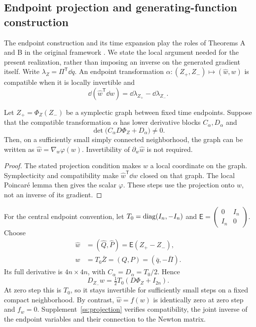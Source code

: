 \subsection{Endpoint projection and generating-function construction}
\label{struct:endpoint-section}

The endpoint construction and its time expansion play the roles of Theorems A and B in the original framework \citep{feng,fengqin}. We state the local argument needed for the present realization, rather than imposing an inverse on the generated gradient itself. Write $\lambda_Z=\Pi^{\mathsf T}\dd q$. An endpoint transformation $\alpha:(Z_+,Z_-)\mapsto(\widehat w,w)$ is compatible when it is locally invertible and
\[
 \dd(\widehat w^{\mathsf T}\dd w)
      =\dd\lambda_{Z_+}-\dd\lambda_{Z_-}.
\]

\begin{proposition}
\label{struct:endpoint-proposition}
Let $Z_+=\Phi_Z(Z_-)$ be a symplectic graph between fixed time endpoints. Suppose that the compatible transformation $\alpha$ has lower derivative blocks $C_\alpha,D_\alpha$ and
\[
 \det\bigl(C_\alpha D\Phi_Z+D_\alpha\bigr)\ne0.
\]
Then, on a sufficiently small simply connected neighborhood, the graph can be written as $\widehat w=\nabla_w\varphi(w)$. Invertibility of $\partial_w\widehat w$ is not required.
\end{proposition}

\begin{proof}
The stated projection condition makes $w$ a local coordinate on the graph. Symplecticity and compatibility make $\widehat w^{\mathsf T}\dd w$ closed on that graph. The local Poincar\'e lemma then gives the scalar $\varphi$. These steps use the projection onto $w$, not an inverse of its gradient.
\end{proof}

For the central endpoint convention, let $T_0=\operatorname{diag}(I_n,-I_n)$ and $\mathsf E=\left(\begin{smallmatrix}0&I_n\\I_n&0\end{smallmatrix}\right)$. Choose
\begin{equation}\label{struct:endpoint-variables}
\begin{aligned}
 \widehat w&=(\widehat Q,\widehat P)=\mathsf E(Z_+-Z_-),\\
 w&=T_0\bar Z=(Q,P)=(\bar q,-\bar\Pi).
\end{aligned}
\end{equation}
Its full derivative is $4n\times4n$, with $C_\alpha=D_\alpha=T_0/2$. Hence
\begin{equation}\label{struct:endpoint-projection}
 D_{Z_-}w=\tfrac12T_0(D\Phi_Z+I_{2n}).
\end{equation}
At zero step this is $T_0$, so it stays invertible for sufficiently small steps on a fixed compact neighborhood. By contrast, $\widehat w=f(w)$ is identically zero at zero step and $f_w=0$. Supplement~\ref{ss:projection} verifies compatibility, the joint inverse of the endpoint variables and their connection to the Newton matrix.

